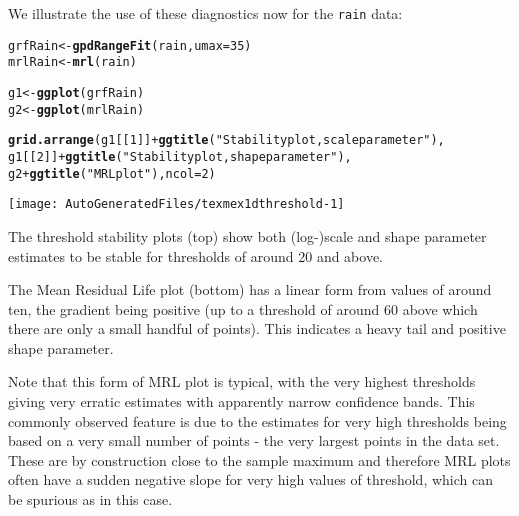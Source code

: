 \documentclass[10pt]{article}\usepackage[]{graphicx}\usepackage[]{color}
\makeatletter
\def\maxwidth{ %
  \ifdim\Gin@nat@width>\linewidth
    \linewidth
  \else
    \Gin@nat@width
  \fi
}
\newcommand{\hlnum}[1]{\textcolor[rgb]{0.686,0.059,0.569}{#1}}%
\newcommand{\hlstr}[1]{\textcolor[rgb]{0.192,0.494,0.8}{#1}}%
\newcommand{\hlopt}[1]{\textcolor[rgb]{0,0,0}{#1}}%
\newcommand{\hlstd}[1]{\textcolor[rgb]{0.345,0.345,0.345}{#1}}%
\newcommand{\hlkwb}[1]{\textcolor[rgb]{0.69,0.353,0.396}{#1}}%
\newcommand{\hlkwc}[1]{\textcolor[rgb]{0.333,0.667,0.333}{#1}}%
\newcommand{\hlkwd}[1]{\textcolor[rgb]{0.737,0.353,0.396}{\textbf{#1}}}%
\newenvironment{kframe}{%
 \def\at@end@of@kframe{}%
 \ifinner\ifhmode%
  \def\at@end@of@kframe{\end{minipage}}%
  \begin{minipage}{\columnwidth}%
 \fi\fi%
 \def\FrameCommand##1{\hskip\@totalleftmargin \hskip-\fboxsep
 \colorbox{shadecolor}{##1}\hskip-\fboxsep
     \hskip-\linewidth \hskip-\@totalleftmargin \hskip\columnwidth}%
 \MakeFramed {\advance\hsize-\width
   \@totalleftmargin\z@ \linewidth\hsize
   \@setminipage}}%
 {\par\unskip\endMakeFramed%
 \at@end@of@kframe}
\newenvironment{knitrout}{}{} %
\makeatother
\begin{document}
We illustrate the use of these diagnostics now for the {\tt rain} data:
\begin{knitrout}
\color{fgcolor}\begin{kframe}
\begin{alltt}
\hlstd{grfRain} \hlkwb{<-} \hlkwd{gpdRangeFit}\hlstd{(rain,}\hlkwc{umax}\hlstd{=}\hlnum{35}\hlstd{)}
\hlstd{mrlRain} \hlkwb{<-} \hlkwd{mrl}\hlstd{(rain)}

\hlstd{g1} \hlkwb{<-} \hlkwd{ggplot}\hlstd{(grfRain)}
\hlstd{g2} \hlkwb{<-} \hlkwd{ggplot}\hlstd{(mrlRain)}

\hlkwd{grid.arrange}\hlstd{(g1[[}\hlnum{1}\hlstd{]]} \hlopt{+} \hlkwd{ggtitle}\hlstd{(}\hlstr{"Stability plot, scale parameter"}\hlstd{),}
             \hlstd{g1[[}\hlnum{2}\hlstd{]]} \hlopt{+} \hlkwd{ggtitle}\hlstd{(}\hlstr{"Stability plot, shape parameter"}\hlstd{),}
             \hlstd{g2} \hlopt{+} \hlkwd{ggtitle}\hlstd{(}\hlstr{"MRL plot"}\hlstd{),}\hlkwc{ncol}\hlstd{=}\hlnum{2}\hlstd{)}
\end{alltt}
\end{kframe}
\texttt{[image: AutoGeneratedFiles/texmex1dthreshold-1]} 

\end{knitrout}
The threshold stability plots (top) show both (log-)scale and shape parameter estimates to be stable for thresholds of around 20 and above.

The Mean Residual Life plot (bottom) has a linear form from values of around ten, the gradient being positive (up to a threshold of around 60 above which there are only a small handful of points).  This indicates a heavy tail and positive shape parameter.

Note that this form of MRL plot is typical, with the very highest thresholds giving very erratic estimates with apparently narrow confidence bands.  This commonly observed feature is due to the estimates for very high thresholds being based on a very small number of points - the very largest points in the data set.  These are by construction close to the sample maximum and therefore MRL plots often have a sudden negative slope for very high values of threshold, which can be spurious as in this case.
\end{document}
